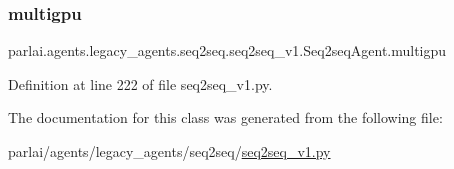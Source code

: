 \subsubsection{\texorpdfstring{multigpu}{multigpu}}
{\footnotesize\ttfamily parlai.\+agents.\+legacy\+\_\+agents.\+seq2seq.\+seq2seq\+\_\+v1.\+Seq2seq\+Agent.\+multigpu}



Definition at line 222 of file seq2seq\+\_\+v1.\+py.



The documentation for this class was generated from the following file\+:\begin{DoxyCompactItemize}
\item 
parlai/agents/legacy\+\_\+agents/seq2seq/\hyperlink{seq2seq__v1_8py}{seq2seq\+\_\+v1.\+py}\end{DoxyCompactItemize}
